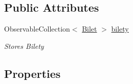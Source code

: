 \subsection*{Public Attributes}
\begin{DoxyCompactItemize}
\item 
Observable\+Collection$<$ \mbox{\hyperlink{class_silnik_1_1_bilet}{Bilet}} $>$ \mbox{\hyperlink{class_silnik_1_1_lot_a3e02a16efd94bb1428ee6f3a34aacd8d}{bilety}}
\begin{DoxyCompactList}\small\item\em Stores Bilety\end{DoxyCompactList}\end{DoxyCompactItemize}
\subsection*{Properties}
